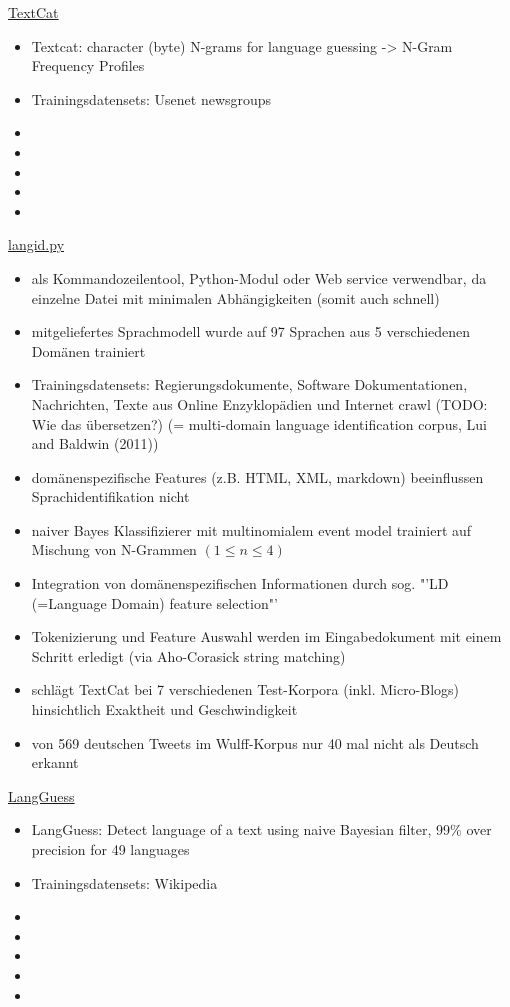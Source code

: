 \documentclass[11pt]{article}
\begin{document}
\underline{TextCat} \newline
\begin{itemize}
\item Textcat: character (byte) N-grams for language guessing -> N-Gram
Frequency Profiles
\item Trainingsdatensets: Usenet newsgroups
\item
\item
\item
\item
\item
\end{itemize}


\underline{langid.py} \newline
\begin{itemize}
\item als Kommandozeilentool, Python-Modul oder Web service verwendbar, da einzelne Datei mit  minimalen Abhängigkeiten (somit auch schnell)
\item mitgeliefertes Sprachmodell wurde auf 97 Sprachen aus 5 verschiedenen Domänen trainiert
\item Trainingsdatensets: Regierungsdokumente, Software Dokumentationen, Nachrichten,  Texte aus Online Enzyklopädien und Internet crawl (TODO: Wie das übersetzen?) (= multi-domain language identification corpus, Lui and Baldwin (2011))
\item domänenspezifische Features (z.B. HTML, XML, markdown) beeinflussen Sprachidentifikation nicht
\item  naiver Bayes Klassifizierer mit multinomialem event model trainiert auf Mischung von N-Grammen $(1\leq n \leq4)$
\item Integration von domänenspezifischen Informationen durch sog. "'LD (=Language Domain) feature selection"'
\item Tokenizierung und Feature Auswahl werden im Eingabedokument mit einem Schritt erledigt (via Aho-Corasick string matching)
\item schlägt TextCat bei 7 verschiedenen Test-Korpora (inkl. Micro-Blogs)  hinsichtlich Exaktheit und Geschwindigkeit
\item von 569 deutschen Tweets im Wulff-Korpus nur 40 mal nicht als Deutsch erkannt
\end{itemize}

\underline{LangGuess} \newline
\begin{itemize}
\item LangGuess: Detect language of a text using naive Bayesian filter, 99\% over
precision for 49 languages
\item Trainingsdatensets: Wikipedia
\item
\item
\item
\item
\item
\end{itemize}
\end{document}
